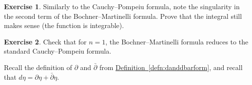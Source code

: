\documentclass[12pt,openany]{book}
\theoremstyle{plain}
\theoremstyle{remark}
\theoremstyle{definition}
\newenvironment{exbox}{%
    \def\FrameCommand{\vrule width 1pt \relax\hspace{10pt}}%
    \MakeFramed{\advance\hsize-\width\FrameRestore}%
}{%
    \endMakeFramed
}
\theoremstyle{exercise}
\newtheorem{exercise}{Exercise}[section]
\theoremstyle{example}
\newcommand{\defnref}[1]{\hyperref[#1]{Definition~\ref*{#1}}}
\begin{document}
\begin{exbox}
\begin{exercise}
Similarly to the Cauchy--Pompeiu formula,
note the singularity in the second term of the Bochner--Martinelli formula.
Prove that the integral still makes
sense (the function is integrable).
\end{exercise}

\begin{exercise}
Check that for $n=1$, the Bochner--Martinelli formula
reduces to the standard Cauchy--Pompeiu formula.
\end{exercise}
\end{exbox}

Recall the definition of $\partial$ and $\bar{\partial}$ from
\defnref{defn:danddbarform}, and recall that $d \eta = \partial \eta +
\bar{\partial} \eta$.
\end{document}
